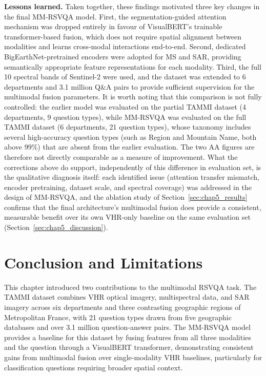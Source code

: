 \textbf{Lessons learned.} Taken together, these findings
motivated three key changes in the final MM-RSVQA model.
First, the segmentation-guided attention mechanism was
dropped entirely in favour of VisualBERT's trainable
transformer-based fusion, which does not require spatial
alignment between modalities and learns cross-modal
interactions end-to-end. Second, dedicated
BigEarthNet-pretrained encoders were adopted for MS and
SAR, providing semantically appropriate feature
representations for each modality. Third, the full 10
spectral bands of Sentinel-2 were used, and the dataset
was extended to 6 departments and 3.1 million Q\&A pairs
to provide sufficient supervision for the multimodal
fusion parameters. It is worth noting that this comparison is not fully
controlled: the earlier model was evaluated on the
partial TAMMI dataset (4 departments, 9 question types),
while MM-RSVQA was evaluated on the full TAMMI dataset
(6 departments, 21 question types), whose taxonomy
includes several high-accuracy question types (such as
Region and Mountain Name, both above 99\%) that are
absent from the earlier evaluation. The two AA figures
are therefore not directly comparable as a measure of
improvement. What the corrections above do support,
independently of this difference in evaluation set, is
the qualitative diagnosis itself: each identified issue
(attention transfer mismatch, encoder pretraining,
dataset scale, and spectral coverage) was addressed in
the design of MM-RSVQA, and the ablation study of
Section~\ref{sec:chap5_results} confirms that the final
architecture's multimodal fusion does provide a
consistent, measurable benefit over its own VHR-only
baseline on the same evaluation set
(Section~\ref{sec:chap5_discussion}).

\section{Conclusion and Limitations}
\label{sec:chap5_conclusion}

This chapter introduced two contributions to the
multimodal RSVQA task. The TAMMI dataset combines VHR
optical imagery, multispectral data, and SAR imagery
across six departments and three contrasting geographic
regions of Metropolitan France, with 21 question types
drawn from five geographic databases and over 3.1 million
question-answer pairs. The MM-RSVQA model provides a
baseline for this dataset by fusing features from all
three modalities and the question through a VisualBERT
transformer, demonstrating consistent gains from
multimodal fusion over single-modality VHR baselines,
particularly for classification questions requiring
broader spatial context.


